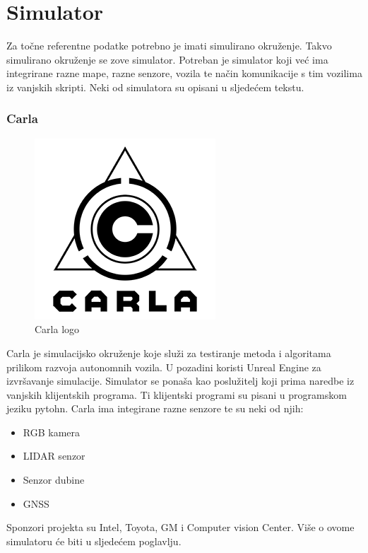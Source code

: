 \section{Simulator}

Za točne referentne podatke potrebno je imati simulirano okruženje. Takvo simulirano okruženje se zove simulator. Potreban je simulator koji već ima integrirane razne mape, razne senzore, vozila te način komunikacije s tim vozilima iz vanjskih skripti. Neki od simulatora su opisani u sljedećem tekstu.

\subsubsection{Carla}
\begin{figure}[ht!]
  \centering
  \includegraphics[scale=0.5]{images/carla_logo.png}
  \caption{Carla logo\cite{logo:carla}}
\end{figure}

Carla\cite{dosovitskiy17} je simulacijsko okruženje koje služi za testiranje metoda i algoritama prilikom razvoja autonomnih vozila. U pozadini koristi Unreal Engine za izvršavanje simulacije. Simulator se ponaša kao poslužitelj koji prima naredbe iz vanjskih klijentskih programa. Ti klijentski programi su pisani u programskom jeziku pytohn.
Carla ima integirane razne senzore te su neki od njih:
\begin{itemize}
  \item RGB kamera
  \item LIDAR senzor
  \item Senzor dubine
  \item GNSS
\end{itemize}

Sponzori projekta su Intel, Toyota, GM i Computer vision Center. Više o ovome simulatoru će biti u sljedećem poglavlju.

